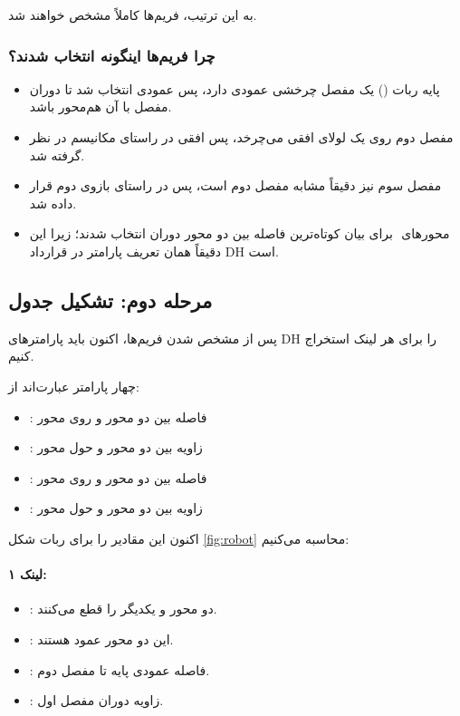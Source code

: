 \documentclass{article}
\begin{document}
به این ترتیب، فریم‌ها کاملاً مشخص خواهند شد.

\subsubsection*{چرا فریم‌ها اینگونه انتخاب شدند؟}

\begin{itemize}
	\item پایه ربات () یک مفصل چرخشی عمودی دارد، پس  عمودی انتخاب شد تا دوران مفصل با آن هم‌محور باشد.
	\item مفصل دوم روی یک لولای افقی می‌چرخد، پس  افقی در راستای مکانیسم در نظر گرفته شد.
	\item مفصل سوم نیز دقیقاً مشابه مفصل دوم است، پس  در راستای بازوی دوم قرار داده شد.
	\item محورهای ‌ برای بیان کوتاه‌ترین فاصله بین دو محور دوران انتخاب شدند؛ زیرا این دقیقاً همان تعریف پارامتر  در قرارداد DH است.
\end{itemize}

\subsection{مرحله دوم: تشکیل جدول }

پس از مشخص شدن فریم‌ها، اکنون باید پارامترهای DH را برای هر لینک استخراج کنیم.

چهار پارامتر  عبارت‌اند از:

\begin{itemize}
	\item {}: فاصله بین دو محور  و  روی محور 
	\item {}: زاویه بین دو محور  و  حول محور 
	\item {}: فاصله بین دو محور  و  روی محور 
	\item {}: زاویه بین دو محور  و  حول محور 
\end{itemize}

اکنون این مقادیر را برای ربات شکل \ref{fig:robot} محاسبه می‌کنیم:

\paragraph*{لینک ۱:}
\begin{itemize}
	\item {}: دو محور  و  یکدیگر را قطع می‌کنند.
	\item {}: این دو محور عمود هستند.
	\item {}: فاصله عمودی پایه تا مفصل دوم.
	\item {}: زاویه دوران مفصل اول.
\end{itemize}
\end{document}
